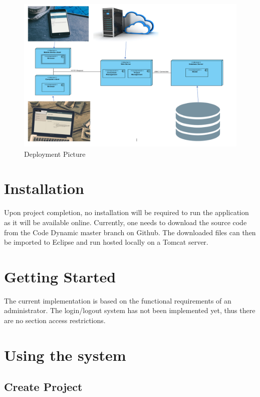 \documentclass[a4paper, 12pt, oneside]{article}
\begin{document}
\begin{figure}[h]

  \centering

  \includegraphics[width=\linewidth]{images/deploymentPic.PNG}

  \caption{Deployment Picture}

  \label{fig:sfig1}

\end{figure}

\section{Installation}

Upon project completion, no installation will be required to run the application as it will be available online.
Currently, one needs to download the source code from the Code Dynamic master branch on Github. The downloaded files can then be imported to Eclipse and run hosted locally on a Tomcat server.


\section{Getting Started}

The current implementation is based on the functional requirements of an administrator. The login/logout system has not been implemented yet, thus there are no section access restrictions.


\section{Using the system}

\subsection{Create Project}
\end{document}
